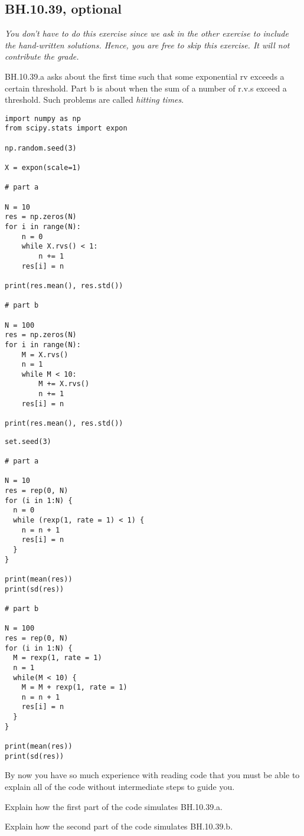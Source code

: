 

\subsection{BH.10.39, optional}

\emph{You don't have to do this exercise since we ask in the other exercise to include the hand-written solutions. Hence, you are free to skip this exercise. It will not contribute the grade.}



BH.10.39.a asks about the first time such that some exponential rv exceeds a certain threshold.
Part b is about when the sum of a number of r.v.s exceed a threshold.
Such problems are called \emph{hitting times}.

\begin{verbatim}
import numpy as np
from scipy.stats import expon

np.random.seed(3)

X = expon(scale=1)

# part a

N = 10
res = np.zeros(N)
for i in range(N):
    n = 0
    while X.rvs() < 1:
        n += 1
    res[i] = n

print(res.mean(), res.std())

# part b

N = 100
res = np.zeros(N)
for i in range(N):
    M = X.rvs()
    n = 1
    while M < 10:
        M += X.rvs()
        n += 1
    res[i] = n

print(res.mean(), res.std())
\end{verbatim}

\begin{verbatim}
set.seed(3)

# part a

N = 10
res = rep(0, N)
for (i in 1:N) {
  n = 0
  while (rexp(1, rate = 1) < 1) {
    n = n + 1
    res[i] = n
  }
}

print(mean(res))
print(sd(res))

# part b

N = 100
res = rep(0, N)
for (i in 1:N) {
  M = rexp(1, rate = 1)
  n = 1
  while(M < 10) {
    M = M + rexp(1, rate = 1)
    n = n + 1
    res[i] = n
  }
}

print(mean(res))
print(sd(res))
\end{verbatim}


By now you have so much experience with reading code that you must be able to explain all of the code without intermediate steps to guide you.
\begin{exercise}
Explain how the first part of the code simulates BH.10.39.a.
\end{exercise}

\begin{exercise}
Explain how the second part of the code simulates BH.10.39.b.
\end{exercise}

